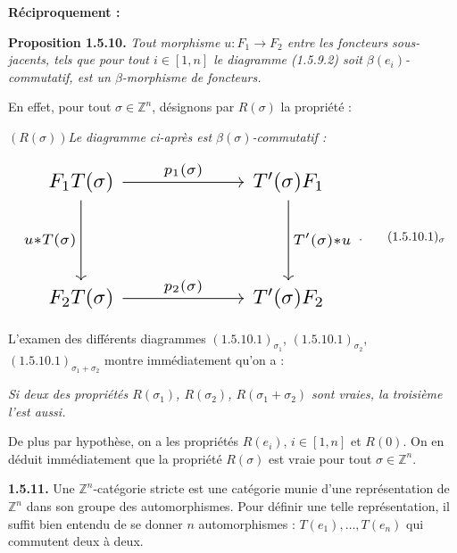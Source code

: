 %
\noindent\textbf{Réciproquement :}\par

\noindent\textbf{Proposition 1.5.10.}\quad
\emph{Tout morphisme $u\colon F_1\to F_2$ entre les foncteurs
sous-jacents, tels que pour tout $i\in[1,n]$ le diagramme (1.5.9.2)
soit $\beta(e_i)$-commutatif, est un $\beta$-morphisme de foncteurs.}

En effet, pour tout $\sigma\in\mathbb Z^n$, désignons par $R(\sigma)$
la propriété :

\noindent\emph{$(R(\sigma))$\qquad Le diagramme ci-après est
$\beta(\sigma)$-commutatif :}

\begin{equation}
  \resizebox{0.78\textwidth}{!}{%
    $\begin{tikzcd}[ampersand replacement=\&,column sep=6em,row sep=4em]
      F_1T(\sigma)
        \arrow[r,"{p_1(\sigma)}"]
        \arrow[d,"{u*T(\sigma)}"']
        \& T'(\sigma)F_1
          \arrow[d,"{T'(\sigma)*u}"] \\
      F_2T(\sigma)
        \arrow[r,"{p_2(\sigma)}"]
        \& T'(\sigma)F_2
    \end{tikzcd}$%
  }\;.
  \tag*{\ensuremath{(1.5.10.1)_{\sigma}}}
\end{equation}

L'examen des différents diagrammes
$(1.5.10.1)_{\sigma_1}$, $(1.5.10.1)_{\sigma_2}$,
$(1.5.10.1)_{\sigma_1+\sigma_2}$ montre immédiatement qu'on a :

\noindent\emph{Si deux des propriétés $R(\sigma_1)$, $R(\sigma_2)$,
$R(\sigma_1+\sigma_2)$ sont vraies, la troisième l'est aussi.}

De plus par hypothèse, on a les propriétés $R(e_i)$, $i\in[1,n]$ et
$R(0)$. On en déduit immédiatement que la propriété $R(\sigma)$ est
vraie pour tout $\sigma\in\mathbb Z^n$.

\noindent\textbf{1.5.11.}\quad
Une $\mathbb Z^n$-catégorie stricte est une catégorie munie d'une
représentation de $\mathbb Z^n$ dans son groupe des automorphismes. Pour
définir une telle représentation, il suffit bien entendu de se donner
$n$ automorphismes :
$T(e_1),\ldots,T(e_n)$ qui commutent deux à deux.

